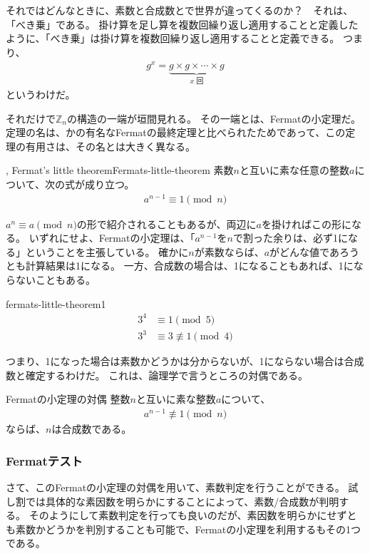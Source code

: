それではどんなときに、素数と合成数とで世界が違ってくるのか？　それは、「べき乗」である。
掛け算を足し算を複数回繰り返し適用することと定義したように、「べき乗」は掛け算を複数回繰り返し適用することと定義できる。
つまり、
\begin{align*}
g^x = \underbrace{g \times g \times \cdots \times g}_{x \mbox{ 回}}
\end{align*}
というわけだ。

それだけで$\mathbb{Z}_n$の構造の一端が垣間見れる。
その一端とは、Fermatの小定理だ。
定理の名は、かの有名なFermatの最終定理と比べられたためであって、この定理の有用さは、その名とは大きく異なる。

\begin{Theo}{, Fermat's little theorem}{Fermats-little-theorem}
素数$n$と互いに素な任意の整数$a$について、次の式が成り立つ。
\begin{align*}
a^{n-1} \equiv 1 \pmod{n}
\end{align*}
\end{Theo}

$a^n\equiv a\pmod{n}$の形で紹介されることもあるが、両辺に$a$を掛ければこの形になる。
いずれにせよ、Fermatの小定理は、「$a^{n-1}$を$n$で割った余りは、必ず1になる」ということを主張している。
確かに$n$が素数ならば、$a$がどんな値であろうとも計算結果は1になる。
一方、合成数の場合は、1になることもあれば、1にならないこともある。

\begin{Exam}{}{fermats-little-theorem1}
\begin{align*}
3^4 &\equiv 1 \pmod{5}\\
3^3 &\equiv 3 \not\equiv 1 \pmod{4}
\end{align*}
\end{Exam}

つまり、1になった場合は素数かどうかは分からないが、1にならない場合は合成数と確定するわけだ。
これは、論理学で言うところの対偶である。

\begin{Theo}{Fermatの小定理の対偶}{}
整数$n$と互いに素な整数$a$について、
\begin{align*}
a^{n-1} \not\equiv 1 \pmod{n}
\end{align*}
ならば、$n$は合成数である。
\end{Theo}

\subsubsection{Fermatテスト}
さて、このFermatの小定理の対偶を用いて、素数判定を行うことができる。
試し割では具体的な素因数を明らかにすることによって、素数/合成数が判明する。
そのようにして素数判定を行っても良いのだが、素因数を明らかにせずとも素数かどうかを判別することも可能で、Fermatの小定理を利用するもその1つである。

